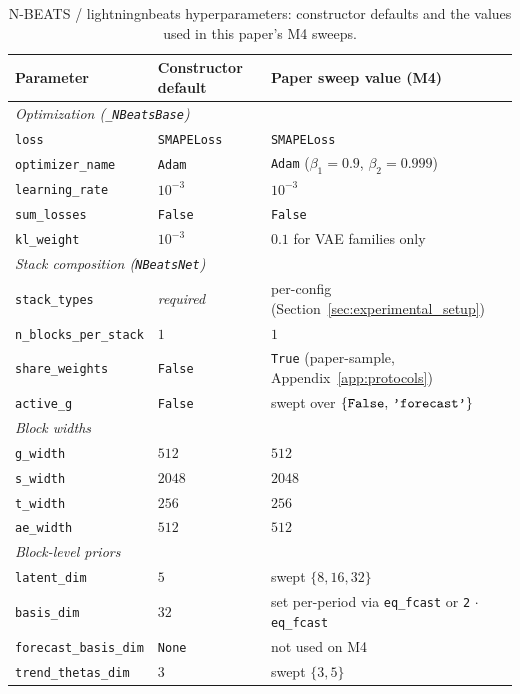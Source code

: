 \documentclass[11pt,a4paper]{article}
\begin{document}
\begin{table}[h]
\centering
\small
\caption{N-BEATS / lightningnbeats hyperparameters: constructor defaults and the values used in this paper's M4 sweeps.}
\label{tab:hyperparams_defaults}
\begin{tabular}{@{}lll@{}}
\toprule
Parameter & Constructor default & Paper sweep value (M4) \\
\midrule
\multicolumn{3}{l}{\textit{Optimization (\texttt{\_NBeatsBase})}} \\
\texttt{loss} & \texttt{SMAPELoss} & \texttt{SMAPELoss} \\
\texttt{optimizer\_name} & \texttt{Adam} & \texttt{Adam} ($\beta_1{=}0.9$, $\beta_2{=}0.999$) \\
\texttt{learning\_rate} & $10^{-3}$ & $10^{-3}$ \\
\texttt{sum\_losses} & \texttt{False} & \texttt{False} \\
\texttt{kl\_weight} & $10^{-3}$ & $0.1$ for VAE families only \\
\midrule
\multicolumn{3}{l}{\textit{Stack composition (\texttt{NBeatsNet})}} \\
\texttt{stack\_types} & \emph{required} & per-config (Section~\ref{sec:experimental_setup}) \\
\texttt{n\_blocks\_per\_stack} & $1$ & $1$ \\
\texttt{share\_weights} & \texttt{False} & \texttt{True} (paper-sample, Appendix~\ref{app:protocols}) \\
\texttt{active\_g} & \texttt{False} & swept over $\{\text{\texttt{False}},\,\text{\texttt{'forecast'}}\}$ \\
\midrule
\multicolumn{3}{l}{\textit{Block widths}} \\
\texttt{g\_width} & $512$ & $512$ \\
\texttt{s\_width} & $2048$ & $2048$ \\
\texttt{t\_width} & $256$ & $256$ \\
\texttt{ae\_width} & $512$ & $512$ \\
\midrule
\multicolumn{3}{l}{\textit{Block-level priors}} \\
\texttt{latent\_dim} & $5$ & swept $\{8, 16, 32\}$ \\
\texttt{basis\_dim} & $32$ & set per-period via \texttt{eq\_fcast} or \texttt{2}$\,\cdot\,$\texttt{eq\_fcast} \\
\texttt{forecast\_basis\_dim} & \texttt{None} & not used on M4 \\
\texttt{trend\_thetas\_dim} & $3$ & swept $\{3, 5\}$ \\

\end{tabular}
\end{table}
\end{document}
